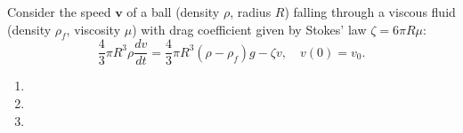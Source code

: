 \begin{exercise}
\label{applied:2013:3}
Consider the speed $\mathbf{v}$ of a ball (density $\rho$, radius $R$) falling through a viscous fluid (density $\rho_{f}$, viscosity $\mu$) with drag coefficient given by Stokes' law $\zeta=6\pi R\mu$:
\[
\frac{4}{3}\pi R^{3}\rho\frac{dv}{dt}=\frac{4}{3}\pi R^{3}(\rho-\rho_{f})g-\zeta v,\quad v(0)=v_{0}.
\]

\begin{enumerate}
\item[(a)] %
\item[(b)] %
\item[(c)] %
\end{enumerate}
\end{exercise}

